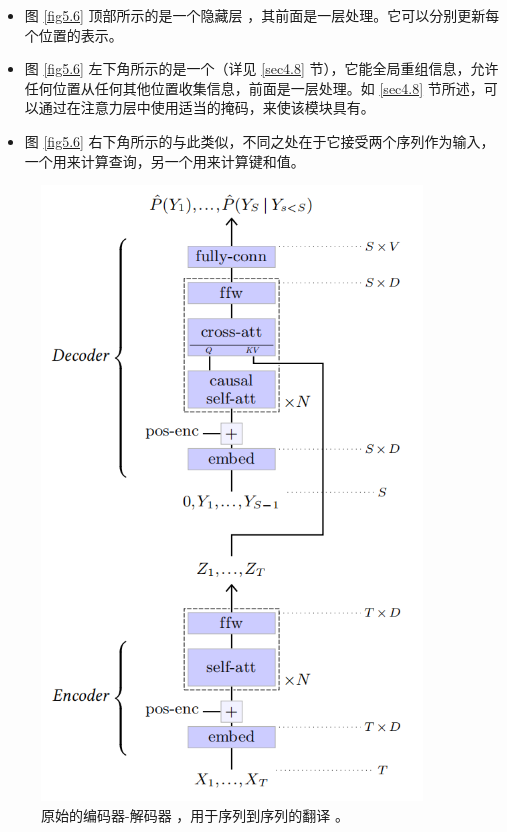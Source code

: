 \begin{itemize}
    \item 图 \ref{fig5.6} 顶部所示的是一个隐藏层 ，其前面是一层处理。它可以分别更新每个位置的表示。
    \item 图 \ref{fig5.6} 左下角所示的是一个（详见 \ref{sec4.8} 节），它能全局重组信息，允许任何位置从任何其他位置收集信息，前面是一层处理。如 \ref{sec4.8} 节所述，可以通过在注意力层中使用适当的掩码，来使该模块具有。
    \item 图 \ref{fig5.6} 右下角所示的与此类似，不同之处在于它接受两个序列作为输入，一个用来计算查询，另一个用来计算键和值。
\end{itemize}

\begin{figure}
    \centering
    \includegraphics[width=0.9\textwidth]{fig/fig5.7.png}
    \caption[Transformer]{原始的编码器-解码器 ，用于序列到序列的翻译 \citep{arxiv-1706.03762}。}
    \label{fig5.7}
\end{figure}

